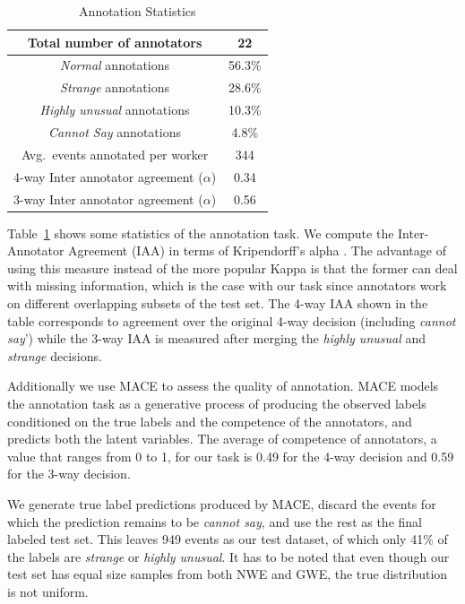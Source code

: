 \begin{table}
\begin{center}
  \begin{tabular}[c]{cc}
 \toprule
  Total number of annotators & 22\\
  \midrule
  \textit{Normal} annotations & 56.3\% \\
  \midrule
  \textit{Strange} annotations & 28.6\% \\
  \midrule
  \textit{Highly unusual} annotations & 10.3\% \\
  \midrule
  \textit{Cannot Say} annotations & 4.8\% \\
  \midrule
  Avg.\ events annotated per worker & 344 \\
  \midrule
  4-way Inter annotator agreement ($\alpha$) & 0.34 \\
  \midrule
  3-way Inter annotator agreement ($\alpha$) & 0.56 \\
  \bottomrule
  \end{tabular}
\end{center}
 \caption{Annotation Statistics}\label{table:annot}
\end{table}
Table~\ref{table:annot} shows some statistics of the annotation task.  We
compute the Inter-Annotator
Agreement (IAA) in terms of Kripendorff's alpha \citep{krippendorff1980content}. 
The advantage of using this
measure instead of the more popular Kappa is that the former can deal with
missing information, which is the case with
our task since annotators work on different overlapping subsets of the test set.
 The 4-way IAA shown in the table 
corresponds to agreement over the original 4-way decision (including
\textit{cannot say}') while the 3-way IAA is measured after merging the 
\textit{highly unusual} and \textit{strange} decisions.  

Additionally we use
MACE \citep{hovy2013learning} to assess the quality of 
annotation.  MACE models the annotation task as a generative process of
producing the observed labels conditioned on the 
true labels and the competence of the annotators, and predicts both the latent
variables.  The average of competence of annotators, 
a value that ranges from 0 to 1, for our task is 0.49 for the 4-way decision and
0.59 for the 3-way decision.  

We generate
true label predictions produced by MACE, discard the events for which the
prediction remains to be \textit{cannot say}, and use the 
rest as the final labeled test set.  This leaves 949 events as our test dataset,
of which only 41\% of the labels are \textit{strange} or \textit{highly
unusual}.  It has to be noted that even though our test set 
has equal size samples from both NWE and GWE, the true distribution is not
uniform.

